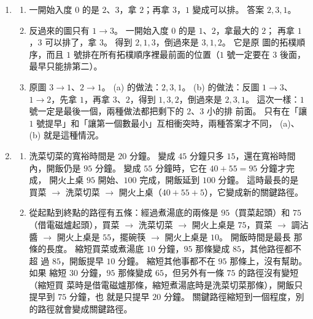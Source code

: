\begin{enumerate}
\item
\begin{enumerate}
\item 一開始入度 $0$ 的是 $2$、$3$，拿 $2$；再拿 $3$，$1$ 變成可以排。 答案
$2, 3, 1$。
\item 反過來的圖只有 $1 \to 3$。 一開始入度 $0$ 的是 $1$、$2$，拿最大的 $2$；
再拿 $1$，$3$ 可以排了，拿 $3$。 得到 $2, 1, 3$，倒過來是 $3, 1, 2$。 它是原
圖的拓樸順序，而且 $1$ 號排在所有拓樸順序裡最前面的位置（$1$ 號一定要在 $3$
後面，最早只能排第二）。
\item 原圖 $3 \to 1$、$2 \to 1$。 (a) 的做法：$2, 3, 1$。 (b) 的做法：反圖
$1 \to 3$、$1 \to 2$，先拿 $1$，再拿 $3$、$2$，得到 $1, 3, 2$，倒過來是
$2, 3, 1$。 這次一樣：$1$ 號一定是最後一個，兩種做法都把剩下的 $2$、$3$ 小的排
前面。 只有在「讓 $1$ 號提早」和「讓第一個數最小」互相衝突時，兩種答案才不同，
(a)、(b) 就是這種情況。
\end{enumerate}

\item
\begin{enumerate}
\item 洗菜切菜的寬裕時間是 $20$ 分鐘。 變成 $45$ 分鐘只多 $15$，還在寬裕時間
內，開飯仍是 $95$ 分鐘。 變成 $55$ 分鐘時，它在 $40 + 55 = 95$ 分鐘才完成，
開火上桌 $95$ 開始、$100$ 完成，開飯延到 $100$ 分鐘。 這時最長的是 買菜
$\to$ 洗菜切菜 $\to$ 開火上桌（$40 + 55 + 5$），它變成新的關鍵路徑。
\item 從起點到終點的路徑有五條：經過煮湯底的兩條是 $95$（買菜起頭）和 $75$
（借電磁爐起頭），買菜 $\to$ 洗菜切菜 $\to$ 開火上桌是 $75$，買菜 $\to$
調沾醬 $\to$ 開火上桌是 $55$，擺碗筷 $\to$ 開火上桌是 $10$。 開飯時間是最長
那條的長度。 縮短買菜或煮湯底 $10$ 分鐘，$95$ 那條變成 $85$，其他路徑都不超
過 $85$，開飯提早 $10$ 分鐘。 縮短其他事都不在 $95$ 那條上，沒有幫助。 如果
縮短 $30$ 分鐘，$95$ 那條變成 $65$，但另外有一條 $75$ 的路徑沒有變短（縮短買
菜時是借電磁爐那條，縮短煮湯底時是洗菜切菜那條），開飯只提早到 $75$ 分鐘，也
就是只提早 $20$ 分鐘。 關鍵路徑縮短到一個程度，別的路徑就會變成關鍵路徑。
\end{enumerate}
\end{enumerate}
